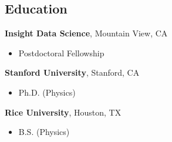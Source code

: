 \documentclass[margin,line]{resume}
\begin{document}
\begin{resume}

    \section{\mysidestyle Education}
    \textbf{Insight Data Science}, Mountain View, CA %
    \begin{itemize}
    \item Postdoctoral Fellowship
    \end{itemize}\vspace{-1.5mm}

    \textbf{Stanford University}, Stanford, CA%
    \begin{itemize}
    \item Ph.D. (Physics)
    \end{itemize}\vspace{-1.5mm}

    \textbf{Rice University}, Houston, TX%
    \begin{itemize}
    \item B.S. (Physics)
    \end{itemize}\vspace{-1.5mm}



\end{resume}
\end{document}
